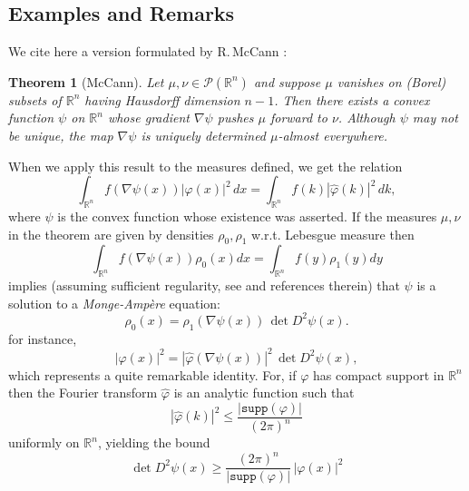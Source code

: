 \documentclass[12pt,a4paper]{article}
\newcommand{\RR}[1]{\mathbb{R}^#1}
\newtheorem{theorem}{Theorem}
\begin{document}
\begin{appendices}
\section{Examples and Remarks}
We cite here a version formulated by R.\,McCann
\cite{mccann_existence_1995}: 
%
\begin{theorem}[McCann]\label{mcann_thm}
Let $\mu,\nu\in\mathcal{P}({\RR n})$ and suppose $\mu$ vanishes on (Borel) subsets of $\RR n$ having Hausdorff dimension $n-1$. Then there exists a convex function $\psi$ on $\RR n$ whose gradient $\nabla\psi$ pushes $\mu$ forward to $\nu$. Although $\psi$ may not be unique, the map $\nabla\psi$ is uniquely determined $\mu$-almost everywhere.
\end{theorem}  
%
When we apply this result to the measures defined, we get 
the relation
%
\begin{equation}
   \int_{\RR n} f(\nabla\psi(x)) |\varphi(x)|^2 \, dx = \int_{\RR n} f(k) 
     |\hat\varphi(k)|^2 \, dk,
\end{equation}
%
where $\psi$ is the convex function whose existence was asserted. 
%
If the measures $\mu,\nu$ in the theorem are given by densities $\rho_0,\rho_1$ 
w.r.t. Lebesgue measure then 
%
\begin{displaymath}
     \int_{\RR n} f(\nabla\psi(x)) \rho_0(x) dx =
     \int_{\RR n} f(y) \rho_1(y) dy 
\end{displaymath}
%
implies (assuming sufficient regularity, see \cite{mccann_existence_1995} and
references therein) that $\psi$ is a solution to a {\sl Monge-Ampère} equation:
%
\begin{equation}
    \rho_0(x) = \rho_1(\nabla\psi(x)) \, \det D^2\psi(x).
\end{equation}
%
for instance,
\begin{equation}
     |\varphi(x)|^2 = |\hat\varphi(\nabla\psi(x))|^2 \, \det D^2\psi(x),
\end{equation}  
%
which represents a quite remarkable identity. For, if $\varphi$ has compact 
support in $\RR n$ then the Fourier transform $\hat\varphi$ is an analytic
function such that 
%
\begin{displaymath}
   |\hat\varphi(k)|^2 \leq \frac{|\mathtt{supp}(\varphi)|}{(2\pi)^n}
\end{displaymath}   
%
uniformly on $\RR n$, yielding the bound
%
\begin{displaymath}
   \det D^2\psi(x) \geq \frac{(2\pi)^n}{|\mathtt{supp}(\varphi)|}\,|\varphi(x)|^2
\end{displaymath}

\end{appendices}
\end{document}
